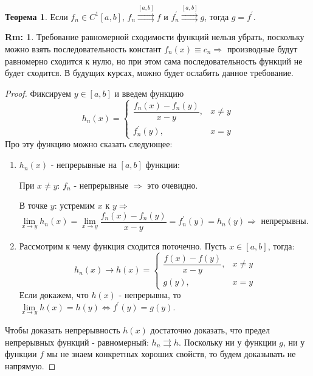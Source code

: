 \documentclass[12pt]{article}
\theoremstyle{definition}
\newtheorem{rem}{Rm:}
\newtheorem{theorem}{Теорема}
\begin{document}
\begin{theorem}
	Если $f_n \in C^1[a,b]$, $f_n \overset{[a,b]}{\rightrightarrows} f$ и $f_n^\prime
	  \overset{[a,b]}{\rightrightarrows} g$, тогда $g = f^\prime$.
\end{theorem}
\begin{rem}
	Требование равномерной сходимости функций нельзя убрать, поскольку можно взять последовательность констант $f_n(x) \equiv c_n \Rightarrow$ производные будут равномерно сходится к нулю, но при этом сама последовательность функций не будет сходится. В будущих курсах, можно будет ослабить данное требование.
\end{rem}
\begin{proof}
	Фиксируем $y \in [a,b]$ и введем функцию 
	$$h_n(x) = \begin{cases} \dfrac{f_n(x) - f_n(y)}{x-y}, & x \neq y\\ f_n^\prime(y), & x = y \end{cases}$$
	Про эту функцию можно сказать следующее:
	\begin{enumerate}[label ={(\arabic*)}]
		\item $h_n(x)$ - непрерывные на $[a,b]$ функции: 
		
		При $x \neq y$: $f_n$ - непрерывные $\Rightarrow$ это очевидно. 
		
		В точке $y$: устремим $x$ к $y \Rightarrow$ $\lim\limits_{x\to y}h_n(x) = \lim\limits_{x \to y} \dfrac{f_n(x) - f_n(y)}{x-y} = f_n^\prime(y) = h_n(y) \Rightarrow$ непрерывны.
		\item Рассмотрим к чему функция сходится поточечно. Пусть $x \in [a,b]$, тогда:
		$$h_n(x) \to h(x) = \begin{cases} \dfrac{f(x) - f(y)}{x-y}, & x \neq y\\ g(y), & x = y \end{cases}$$ 
		Если докажем, что $h(x)$ - непрерывна, то $\lim\limits_{x \to y}h(x) = h(y) \Leftrightarrow f^\prime(y) = g(y)$.
	\end{enumerate} 
	Чтобы доказать непрерывность $h(x)$ достаточно доказать, что предел непрерывных функций - равномерный: $h_n \rightrightarrows h$. Поскольку ни у функции $g$, ни у функции $f$ мы не знаем конкретных хороших свойств, то будем доказывать не напрямую.
	

\end{proof}
\end{document}
